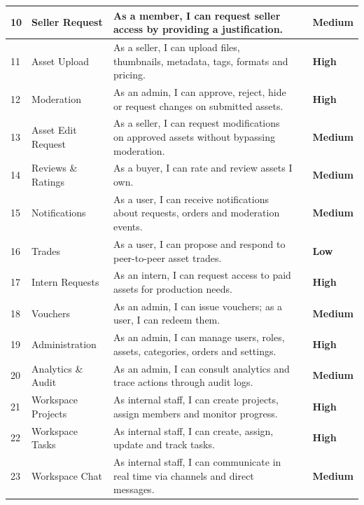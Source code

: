 \begin{longtable}{|C{0.6cm}|L{3.2cm}|L{7.8cm}|C{1.2cm}|C{1.6cm}|}
10 & Seller Request & As a member, I can request seller access by providing a justification. &  & \textbf{Medium} \\\hline
{}
11 & Asset Upload & As a seller, I can upload files, thumbnails, metadata, tags, formats and pricing. &  & \textbf{High} \\\hline
{}
12 & Moderation & As an admin, I can approve, reject, hide or request changes on submitted assets. &  & \textbf{High} \\\hline
{}
13 & Asset Edit Request & As a seller, I can request modifications on approved assets without bypassing moderation. &  & \textbf{Medium} \\\hline
{}
14 & Reviews \& Ratings & As a buyer, I can rate and review assets I own. &  & \textbf{Medium} \\\hline
{}
15 & Notifications & As a user, I can receive notifications about requests, orders and moderation events. &  & \textbf{Medium} \\\hline
{}
16 & Trades & As a user, I can propose and respond to peer-to-peer asset trades. &  & \textbf{Low} \\\hline

17 & Intern Requests & As an intern, I can request access to paid assets for production needs. &  & \textbf{High} \\\hline
{}
18 & Vouchers & As an admin, I can issue vouchers; as a user, I can redeem them. &  & \textbf{Medium} \\\hline
{}
19 & Administration & As an admin, I can manage users, roles, assets, categories, orders and settings. &  & \textbf{High} \\\hline
{}
20 & Analytics \& Audit & As an admin, I can consult analytics and trace actions through audit logs. &  & \textbf{Medium} \\\hline
{}
21 & Workspace Projects & As internal staff, I can create projects, assign members and monitor progress. &  & \textbf{High} \\\hline
{}
22 & Workspace Tasks & As internal staff, I can create, assign, update and track tasks. &  & \textbf{High} \\\hline
{}
23 & Workspace Chat & As internal staff, I can communicate in real time via channels and direct messages. &  & \textbf{Medium} \\\hline


\end{longtable}
